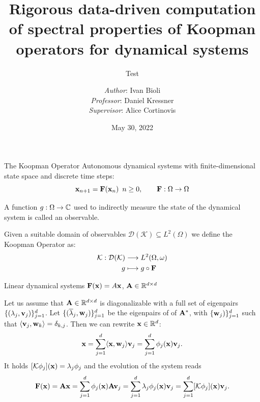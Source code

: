 \documentclass{beamer}
\title[Semester Project]{Rigorous data-driven computation of spectral properties of Koopman operators for dynamical systems}
\subtitle{Test}
\author[Ivan Bioli]{\emph{Author}: Ivan Bioli\\[5mm]{\emph{Professor}: Daniel Kressner \\ \emph{Supervisor}: Alice Cortinovis}}
\institute[EPFL]{École Polytechnique Fédérale de Lausanne\\Master in Computational Sciences and Engineering}
\date{May 30, 2022}
\begin{document}
\begin{frame}
\centering
\titlepage
\end{frame}

\begin{frame}[fragile]{The Koopman Operator}
Autonomous dynamical systems with finite-dimensional state space and discrete time steps:
\begin{equation*}
    \vb{x}_{n+1} = \vb{F}(\vb{x}_n)\,\,\,n\geq 0, \qquad \vb{F}:\Omega \to \Omega
\end{equation*}
\begin{definition}[Observable]
A function $g:\Omega\to\mathbb{C}$ used to indirectly measure the state of the dynamical system is called an observable. 
\end{definition}
\begin{definition}
Given a suitable domain of observables $\mathcal{D}(\mathcal{K}) \subseteq L^2(\Omega)$ we define the Koopman Operator as:
\begin{equation*}
    \label{koopman_def}
    \begin{split}
       \mathcal{K} : \mathcal{D}(\mathcal{K}) &\longrightarrow L^2(\Omega, \omega)
       \\
       g & \longmapsto g \circ \vb{F}
    \end{split}    
\end{equation*} 
\end{definition}
\end{frame}

\begin{frame}[fragile]{Linear dynamical systems}
\centering
$\vb{F}(\vb{x}) = A\vb{x}$, $\vb{A}\in\mathbb{R}^{d\times d}$
\begin{prop}
Let us assume that $\vb{A}\in\mathbb{R}^{d\times d}$ is diagonalizable with a full set of eigenpairs $\{(\lambda_j, \vb{v}_j)\}_{j=1}^{d}$. Let $\{(\overline{\lambda}_j, \vb{w}_j)\}_{j=1}^{d}$ be the eigenpairs of of $\vb{A}^*$, with $\{\vb{w}_j)\}_{j=1}^{d}$ such that $\langle \vb{v}_j, \vb{w}_k\rangle = \delta_{k,j}$. Then we can rewrite $\vb{x}\in\mathbb{R}^d$:
\begin{equation*}
    \label{decomposition_linear}
    \vb{x} = \sum_{j=1}^d \langle \vb{x}, \vb{w}_j\rangle \vb{v}_j = \sum_{j=1}^d \phi_j(\vb{x}) \vb{v}_j.
\end{equation*}
It holds $[\mathcal{K}\phi_j](\vb{x}) = \lambda_j\phi_j$ and the evolution of the system reads
\begin{equation*}
    \label{evolution_linear}
    \vb{F}(\vb{x}) = \vb{A}\vb{x}  = \sum_{j=1}^d \phi_j(\vb{x}) \vb{A}\vb{v}_j = \sum_{j=1}^d \lambda_j \phi_j(\vb{x}) \vb{v}_j = \sum_{j=1}^d [\mathcal{K}\phi_j](\vb{x})\vb{v}_j.
\end{equation*}
\end{prop}
\end{frame}
\end{document}
